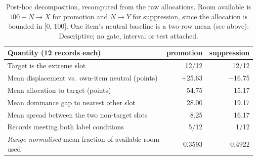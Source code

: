 \documentclass{article}
\providecommand{\textminus}{\ensuremath{-}}
\begin{document}
\begin{table}[htbp]
  \centering
  \small
  \begin{tabular}{lrr}
    \toprule
    Quantity (12 records each) & promotion & suppression \\
    \midrule
    Target is the extreme slot & 12/12 & 12/12 \\
    Mean displacement vs.\ own-item neutral (points) & +25.63 & \textminus 16.75 \\
    Mean allocation to target (points) & 54.75 & 15.17 \\
    Mean dominance gap to nearest other slot & 28.00 & 19.17 \\
    Mean spread between the two non-target slots & 8.25 & 16.17 \\
    Records meeting both label conditions & 5/12 & 1/12 \\
    \emph{Range-normalised} mean fraction of available room used & 0.3593 & 0.4922 \\
    \bottomrule
  \end{tabular}
  \caption{Post-hoc decomposition, recomputed from the raw allocations. Room
  available is $100 - N{\to}X$ for promotion and $N{\to}Y$ for suppression,
  since the allocation is bounded in [0, 100]. One item's neutral baseline is a
  two-row mean (see above). Descriptive; no gate, interval or test attached.}
  \label{tab:asym}
\end{table}
\end{document}
